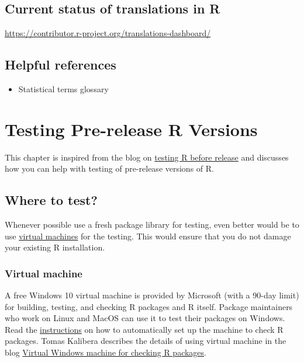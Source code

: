 \documentclass[
]{book}
\providecommand{\tightlist}{%
  \setlength{\itemsep}{0pt}\setlength{\parskip}{0pt}}
\begin{document}
\section{Current status of translations in R}\label{current-status-of-translations-in-r}

\url{https://contributor.r-project.org/translations-dashboard/}

\section{Helpful references}\label{helpful-references}

\begin{itemize}
\tightlist
\item
  Statistical terms glossary
\end{itemize}

\chapter{Testing Pre-release R Versions}\label{TestRVer}

This chapter is inspired from the blog on \href{https://blog.r-project.org/2021/04/28/r-can-use-your-help-testing-r-before-release/index.html}{testing R before release} and discusses how you can help with testing of pre-release versions of R.

\section{Where to test?}\label{where-to-test}

Whenever possible use a fresh package library for testing, even better would be to use \hyperref[VM]{virtual machines} for the testing. This would ensure that you do not damage your existing R installation.

\subsection{Virtual machine}\label{VM}

A free Windows 10 virtual machine is provided by Microsoft (with a 90-day limit) for building, testing, and checking R packages and R itself. Package maintainers who work on Linux and MacOS can use it to test their packages on Windows. Read the \href{https://svn.r-project.org/R-dev-web/trunk/WindowsBuilds/winutf8/ucrt3/vm.html}{instructions} on how to automatically set up the machine to check R packages. Tomas Kalibera describes the details of using virtual machine in the blog \href{https://blog.r-project.org/2021/03/18/virtual-windows-machine-for-checking-r-packages/index.html}{Virtual Windows machine for checking R packages}.
\end{document}
